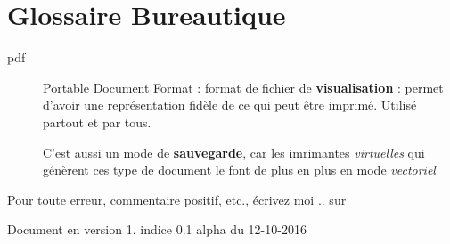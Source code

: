 \documentclass[a4paper,12pt,french]{sphinxmanual}
\begin{document}
\section{Glossaire Bureautique}
\label{burotic/glossaire_burotic:glossaire-burotic}\label{burotic/glossaire_burotic::doc}\label{burotic/glossaire_burotic:glossaire-bureautique}\begin{description}
\item[{pdf}] \leavevmode{}\label{burotic/glossaire_burotic:term-pdf}
Portable Document Format : format de fichier de \textbf{visualisation} : permet d'avoir une représentation fidèle de ce qui peut être imprimé. Utilisé partout et par tous.

C'est aussi un mode de \textbf{sauvegarde}, car les imrimantes \emph{virtuelles} qui génèrent ces type de document le font de plus en plus en mode \emph{vectoriel}

\end{description}

Pour toute erreur, commentaire positif, etc., écrivez moi 
.. sur 

Document en version 1. indice 0.1 alpha du 12-10-2016



\renewcommand{\indexname}{Index}
\printindex
\end{document}
